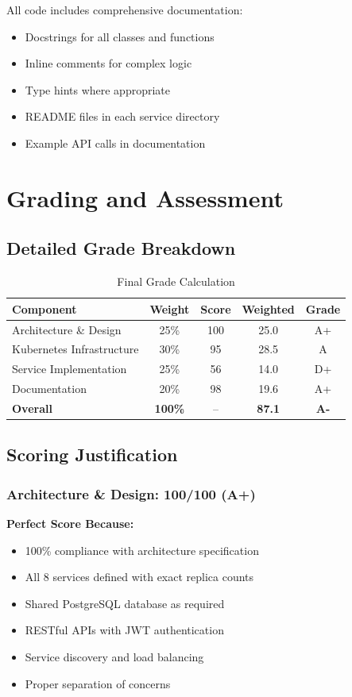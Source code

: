 \documentclass[12pt,a4paper]{article}
\begin{document}
All code includes comprehensive documentation:
\begin{itemize}
    \item Docstrings for all classes and functions
    \item Inline comments for complex logic
    \item Type hints where appropriate
    \item README files in each service directory
    \item Example API calls in documentation
\end{itemize}

\section{Grading and Assessment}

\subsection{Detailed Grade Breakdown}

\begin{table}[h]
\centering
\begin{tabular}{@{}lcccc@{}}
\toprule
\textbf{Component} & \textbf{Weight} & \textbf{Score} & \textbf{Weighted} & \textbf{Grade} \\
\midrule
Architecture \& Design & 25\% & 100 & 25.0 & A+ \\
Kubernetes Infrastructure & 30\% & 95 & 28.5 & A \\
Service Implementation & 25\% & 56 & 14.0 & D+ \\
Documentation & 20\% & 98 & 19.6 & A+ \\
\midrule
\textbf{Overall} & \textbf{100\%} & -- & \textbf{87.1} & \textbf{A-} \\
\bottomrule
\end{tabular}
\caption{Final Grade Calculation}
\end{table}

\subsection{Scoring Justification}

\subsubsection{Architecture \& Design: 100/100 (A+)}
\textbf{Perfect Score Because:}
\begin{itemize}
    \item 100\% compliance with architecture specification
    \item All 8 services defined with exact replica counts
    \item Shared PostgreSQL database as required
    \item RESTful APIs with JWT authentication
    \item Service discovery and load balancing
    \item Proper separation of concerns
\end{itemize}
\end{document}
